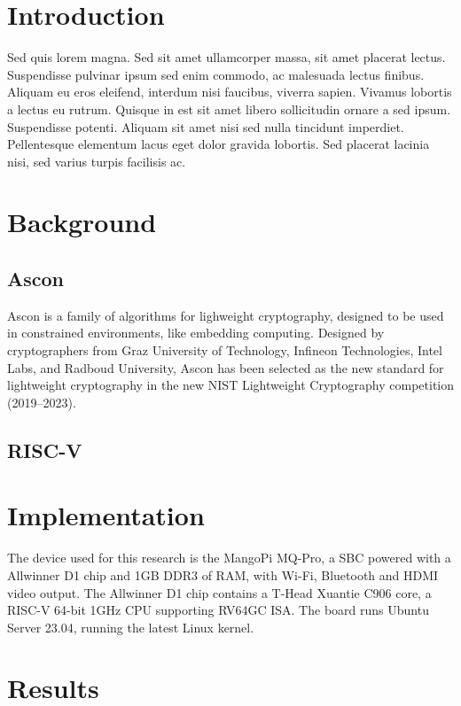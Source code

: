 \documentclass[11pt,twoside]{article}
\begin{document}
\section{Introduction}

  Sed quis lorem magna. Sed sit amet ullamcorper massa, sit amet placerat lectus. 
  Suspendisse pulvinar ipsum sed enim commodo, ac malesuada lectus finibus. Aliquam eu 
  eros eleifend, interdum nisi faucibus, viverra sapien. Vivamus lobortis a lectus eu rutrum. 
  Quisque in est sit amet libero sollicitudin ornare a sed ipsum. Suspendisse potenti. 
  Aliquam sit amet nisi sed nulla tincidunt imperdiet. Pellentesque elementum lacus eget
  dolor gravida lobortis. Sed placerat lacinia nisi, sed varius turpis facilisis ac. 


\section{Background}

\subsection{Ascon}

  Ascon is a family of algorithms for lighweight cryptography, designed to be used in constrained environments,
  like embedding computing. Designed by cryptographers from Graz University of Technology, Infineon Technologies, 
  Intel Labs, and Radboud University, Ascon has been selected as the new standard for lightweight cryptography in
  the new NIST Lightweight Cryptography competition (2019–2023).
\subsection{RISC-V}

\section{Implementation}

  The device used for this research is the MangoPi MQ-Pro, a SBC powered with a Allwinner D1 chip and 1GB DDR3 of RAM, with
  Wi-Fi, Bluetooth and HDMI video output. The Allwinner D1 chip contains a T-Head Xuantie C906 core, a RISC-V 64-bit 1GHz CPU
  supporting RV64GC ISA. The board runs Ubuntu Server 23.04, running the latest Linux kernel.

\section{Results}
\end{document}
